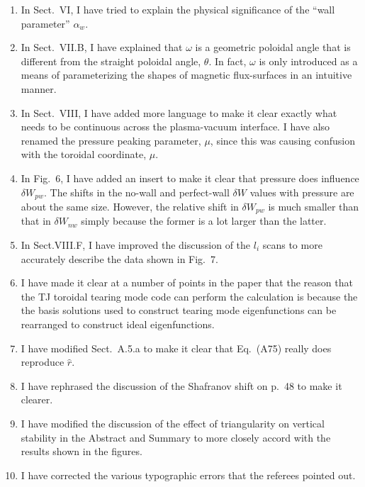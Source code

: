 \documentclass{article}[12pt]
\begin{document}
\begin{enumerate}
\item In Sect.~VI, I have tried to explain the physical significance of the ``wall parameter'' $\alpha_w$. 

\item In Sect.~VII.B, I have explained that $\omega$ is a geometric poloidal angle that is different from the straight poloidal angle, $\theta$.
In fact, $\omega$ is only introduced as a means of parameterizing the shapes of magnetic flux-surfaces in an intuitive manner.

\item In Sect.~VIII, I have added more language to make it clear exactly what needs to be continuous across the plasma-vacuum interface.
I have also renamed the pressure peaking parameter, $\mu$, since this was causing confusion with the toroidal coordinate, $\mu$. 

\item In Fig.~6, I have added an insert to make it clear that pressure does influence $\delta W_{pw}$. The shifts in the 
no-wall and perfect-wall $\delta W$ values with pressure are about the same size. However, the relative shift in $\delta W_{pw}$ is much
smaller than that in $\delta W_{nw}$ simply because the former is a lot larger than the latter. 

\item In Sect.VIII.F, I have improved the discussion of the $l_i$ scans to more accurately describe the data shown in Fig.~7.

\item I have made it clear at a number of points in the paper that the reason that the TJ toroidal tearing mode code can perform the
calculation is because the the basis solutions used to construct tearing mode eigenfunctions can be rearranged  to
construct ideal eigenfunctions. 

\item I have modified Sect.~A.5.a to make it clear that Eq.~(A75) really does reproduce $\hat{r}$. 

\item I have rephrased the discussion of the Shafranov shift on p.~48 to make it clearer.

\item I have modified the discussion of the effect of triangularity on vertical stability in the Abstract and Summary to more closely accord with the
results shown in the figures.

\item I have corrected the various typographic errors that the referees pointed out. 

\end{enumerate}
\end{document}

